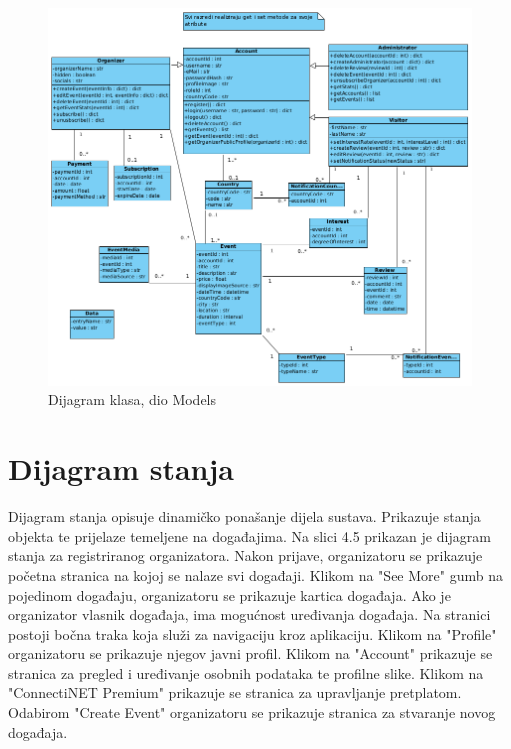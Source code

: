 			\newpage

			\begin{figure}[htbp]
				\centering
				\includegraphics[width=1\textwidth]{dijagrami/dijagram_mvc_models.png}
				\caption{Dijagram klasa, dio Models}
			\label{fig:my_image}
			\end{figure}


			\eject
		
		\newpage
		\section{Dijagram stanja}
			
			
			Dijagram stanja opisuje dinamičko ponašanje dijela sustava.
			Prikazuje stanja objekta te prijelaze temeljene na događajima.
			Na slici 4.5 prikazan je dijagram stanja za registriranog organizatora.
			Nakon prijave, organizatoru se prikazuje početna stranica na kojoj se nalaze svi događaji.
			Klikom na "See More" gumb na pojedinom događaju, organizatoru se prikazuje kartica događaja.
			Ako je organizator vlasnik događaja, ima mogućnost uređivanja događaja.
			Na stranici postoji bočna traka koja služi za navigaciju kroz aplikaciju.
			Klikom na "Profile" organizatoru se prikazuje njegov javni profil.
			Klikom na "Account" prikazuje se stranica za pregled i uređivanje osobnih podataka te profilne slike.
			Klikom na "ConnectiNET Premium" prikazuje se stranica za upravljanje pretplatom.
			Odabirom "Create Event" organizatoru se prikazuje stranica za stvaranje novog događaja.


